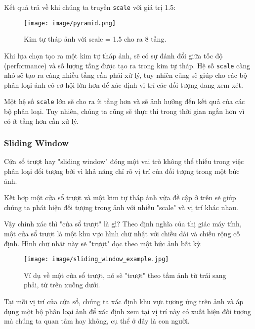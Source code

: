 \documentclass[12pt,a4paper]{article}
\begin{document}
Kết quả trả về khi chúng ta truyền \verb|scale| với giá trị 1.5:

                \begin{figure}[H]
                    \centering
                    \texttt{[image: image/pyramid.png]}
                    \caption{Kim tự tháp ảnh với scale = 1.5 cho ra 8 tầng.}
                    \label{fig:my_label}
                \end{figure}

Khi lựa chọn tạo ra một kim tự tháp ảnh, sẽ có sự đánh đổi giữa tốc độ (performance) và số lượng tầng được tạo ra trong kim tự tháp. Hệ số \verb|scale| càng nhỏ sẽ tạo ra càng nhiều tầng cần phải xử lý, tuy nhiên cũng sẽ giúp cho các bộ phân loại ảnh có cơ hội lớn hơn để xác định vị trí các đối tượng đang xem xét.

Một hệ số \verb|scale| lớn sẽ cho ra ít tầng hơn và sẽ ảnh hưởng đến kết quả của các bộ phân loại. Tuy nhiên, chúng ta cũng sẽ thực thi trong thời gian ngắn hơn vì có ít tầng hơn cần xử lý.
\subsubsection{Sliding Window \cite{sliding}}


Cửa sổ trượt hay "sliding window" đóng một vai trò không thể thiếu trong việc phân loại đối tượng bởi vì khả năng chỉ rõ vị trí của đối tượng trong một bức ảnh.

Kết hợp một cửa sổ trượt và một kim tự tháp ảnh vừa đề cập ở trên sẽ giúp chúng ta phát hiện đối tượng trong ảnh với nhiều "scale" và vị trí khác nhau.

Vậy chính xác thì "cửa sổ trượt" là gì? Theo định nghĩa của thị giác máy tính, một cửa sổ trượt là một khu vực hình chữ nhật với chiều dài và chiều rộng cố định. Hình chữ nhật này sẽ "trượt" dọc theo một bức ảnh bất kỳ.

                 \begin{figure}[H]
                    \centering
                    \texttt{[image: image/sliding\_window\_example.jpg]}
                    \caption{Ví dụ về một cửa sổ trượt, nó sẽ "trượt" theo tấm ảnh từ trái sang phải, từ trên xuống dưới.}
                    \label{fig:my_label}
                \end{figure}

Tại mỗi vị trí của cửa sổ, chúng ta xác định khu vực tương ứng trên ảnh và áp dụng một bộ phân loại ảnh để xác định xem tại vị trí này có xuất hiện đối tượng mà chúng ta quan tâm hay không, cụ thể ở đây là con người.
\end{document}
